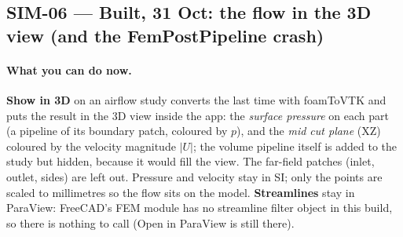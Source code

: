 \subsection{SIM-06 --- Built, 31 Oct: the flow in the 3D view (and the FemPostPipeline crash)}\label{sec:sim06-post-built}

\paragraph{What you can do now.} \textbf{Show in 3D} on an airflow study converts the last time with foamToVTK and
puts the result in the 3D view inside the app: the \emph{surface pressure} on each part (a pipeline of its boundary
patch, coloured by $p$), and the \emph{mid cut plane} (XZ) coloured by the velocity magnitude $|U|$; the volume
pipeline itself is added to the study but hidden, because it would fill the view. The far-field patches (inlet,
outlet, sides) are left out. Pressure and velocity stay in SI; only the points are scaled to millimetres so the flow
sits on the model. \textbf{Streamlines} stay in ParaView: FreeCAD's FEM module has no streamline filter object in
this build, so there is nothing to call (Open in ParaView is still there).

